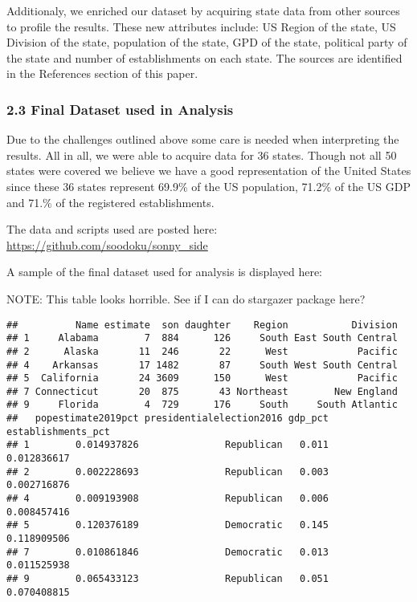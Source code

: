 \documentclass[]{article}
\begin{document}
Additionaly, we enriched our dataset by acquiring state data from other
sources to profile the results. These new attributes include: US Region
of the state, US Division of the state, population of the state, GPD of
the state, political party of the state and number of establishments on
each state. The sources are identified in the References section of this
paper.

\hypertarget{final-dataset-used-in-analysis}{%
\subsubsection{2.3 Final Dataset used in
Analysis}\label{final-dataset-used-in-analysis}}

Due to the challenges outlined above some care is needed when
interpreting the results. All in all, we were able to acquire data for
36 states. Though not all 50 states were covered we believe we have a
good representation of the United States since these 36 states represent
69.9\% of the US population, 71.2\% of the US GDP and 71.\% of the
registered establishments.

The data and scripts used are posted here:
\url{https://github.com/soodoku/sonny_side}

A sample of the final dataset used for analysis is displayed here:

NOTE: This table looks horrible. See if I can do stargazer package here?

\begin{verbatim}
##          Name estimate  son daughter    Region           Division
## 1     Alabama        7  884      126     South East South Central
## 2      Alaska       11  246       22      West            Pacific
## 4    Arkansas       17 1482       87     South West South Central
## 5  California       24 3609      150      West            Pacific
## 7 Connecticut       20  875       43 Northeast        New England
## 9     Florida        4  729      176     South     South Atlantic
##   popestimate2019pct presidentialelection2016 gdp_pct establishments_pct
## 1        0.014937826               Republican   0.011        0.012836617
## 2        0.002228693               Republican   0.003        0.002716876
## 4        0.009193908               Republican   0.006        0.008457416
## 5        0.120376189               Democratic   0.145        0.118909506
## 7        0.010861846               Democratic   0.013        0.011525938
## 9        0.065433123               Republican   0.051        0.070408815
\end{verbatim}
\end{document}
